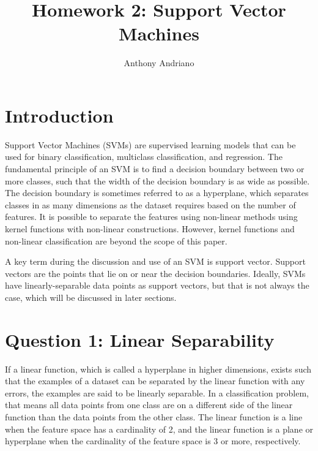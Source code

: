 \documentclass[letterpaper]{article}
\title{Homework 2: Support Vector Machines}
\author {Anthony Andriano}
\begin{document}
\maketitle

\begin{links}
\end{links}

\section{Introduction}
Support Vector Machines (SVMs) are supervised learning models that can be used for binary classification, multiclass classification, and regression. The fundamental principle of an SVM is to find a decision boundary between two or more classes, such that the width of the decision boundary is as wide as possible. The decision boundary is sometimes referred to as a hyperplane, which separates classes in as many dimensions as the dataset requires based on the number of features. It is possible to separate the features using non-linear methods using kernel functions with non-linear constructions. However, kernel functions and non-linear classification are beyond the scope of this paper.

A key term during the discussion and use of an SVM is support vector. Support vectors are the points that lie on or near the decision boundaries. Ideally, SVMs have linearly-separable data points as support vectors, but that is not always the case, which will be discussed in later sections.

\section{Question 1: Linear Separability}
If a linear function, which is called a hyperplane in higher dimensions, exists such that the examples of a dataset can be separated by the linear function with any errors, the examples are said to be linearly separable. In a classification problem, that means all data points from one class are on a different side of the linear function than the data points from the other class. The linear function is a line when the feature space has a cardinality of 2, and the linear function is a plane or hyperplane when the cardinality of the feature space is 3 or more, respectively.
\end{document}
